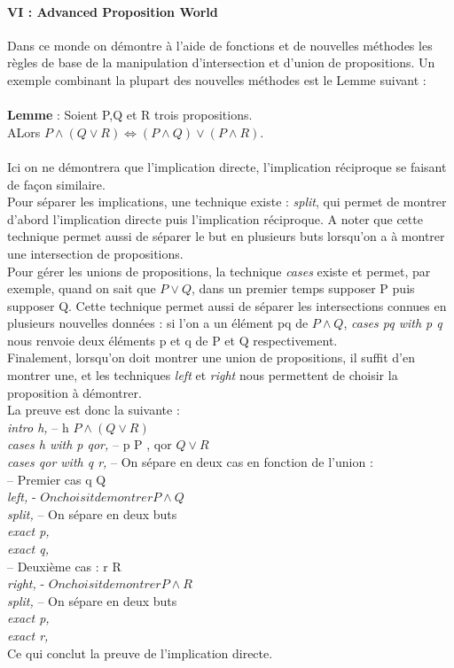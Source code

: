 \documentclass[french,frenchkw]{article}
\begin{document}
\paragraph{VI : Advanced Proposition World}
Dans ce monde on démontre à l'aide de fonctions et de nouvelles méthodes les règles de base de la manipulation d'intersection et d'union de propositions. Un exemple combinant la plupart des nouvelles méthodes est le Lemme suivant : \\
\\
\textbf{Lemme} : Soient P,Q et R trois propositions. \\
ALors $P\land(Q\lor R) \Longleftrightarrow (P\land Q)\lor(P\land R)$.\\
\\
Ici on ne démontrera que l'implication directe, l'implication réciproque se faisant de façon similaire.\\
Pour séparer les implications, une technique existe : \textit{split}, qui permet de montrer d'abord l'implication directe puis l'implication réciproque. A noter que cette technique permet aussi de séparer le but en plusieurs buts lorsqu'on a à montrer une intersection de propositions.\\
Pour gérer les unions de propositions, la technique \textit{cases} existe et permet, par exemple, quand on sait que $P\lor Q$, dans un premier temps supposer P puis supposer Q. Cette technique permet aussi de séparer les intersections connues en plusieurs nouvelles données : si l'on a un élément pq de $P\land Q$, \textit{cases pq with p q} nous renvoie deux éléments p et q de P et Q respectivement.\\
Finalement, lorsqu'on doit montrer une union de propositions, il suffit d'en montrer une, et les techniques \textit{left} et \textit{right} nous permettent de choisir la proposition à démontrer.\\
La preuve est donc la suivante : \\

\textit{intro h,}     -- h \in $P\land (Q\lor R)$\\ 
\textit{cases h with p qor,}     -- p \in P , qor \in $Q\lor R$\\
\textit{cases qor with q r,}     -- On sépare en deux cas en fonction de l'union :\\ 

-- Premier cas q \in Q\\
\textit{left,}   - $On choisit de montrer P\land Q$\\
\textit{split,}     -- On sépare en deux buts\\
\textit{exact p,}\\
\textit{exact q,}\\

-- Deuxième cas : r \in R\\
\textit{right,}     - $On choisit de montrer P\land R$\\
\textit{split,}     -- On sépare en deux buts\\
\textit{exact p,}\\
\textit{exact r,}\\
Ce qui conclut la preuve de l'implication directe.


\end{document}
